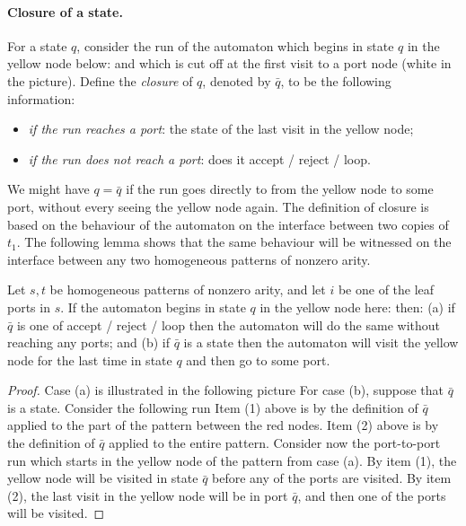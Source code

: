 \paragraph*{Closure of a state.} 
For a state $q$, consider the run of the automaton which begins in state $q$ in the yellow node below:
and which is cut off at the first visit  to a port node (white in the picture).
Define the \emph{closure} of $q$, denoted by $\bar q$, to be the following information:
\begin{itemize}
	\item \emph{if the run reaches a port}: the state of the last visit in the yellow node;
	\item \emph{if the run does not reach a port}: does it accept / reject / loop.
\end{itemize}
We might have $q = \bar q$ if the run goes directly to from the yellow node to some port, without every seeing the yellow node again.
The definition of closure is based on the behaviour of the automaton on the interface between two copies of $t_1$. The following lemma shows that the same behaviour will be witnessed on the interface between any two homogeneous patterns of nonzero arity.
\begin{lemma}\label{lem:twa-bar}
  Let $s,t$ be homogeneous patterns of nonzero arity, and let $i$ be one of the leaf ports in $s$. If the automaton begins in state $q$ in the yellow node here: 
  then:  (a) if $\bar q$ is one of  accept / reject / loop  then the automaton will do the same without reaching any ports; and (b)
  if $\bar q$ is a state then the automaton will visit the yellow node for the last time in state $q$ and then go to some port. \end{lemma}
\begin{proof} 
Case (a) is illustrated in the following picture
For case (b), suppose  that $\bar q$ is a state. Consider the following run 
Item (1) above is by the definition of $\bar q$  applied to the part of the pattern between the red nodes. Item (2) above is by the definition of $\bar q$  applied to the entire pattern. 
Consider now the port-to-port run which starts in the yellow node of the pattern from case (a). By item (1), the yellow node will be visited in state $\bar q$ before any  of the ports are visited. By item (2), the last visit in the yellow node will be in port $\bar q$, and then one of the ports will be visited.
\end{proof}





